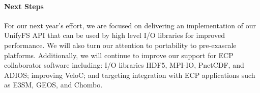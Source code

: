 \paragraph{Next Steps}

For our next year's effort, we are focused on delivering an implementation
of our UnifyFS API that can be used by high level I/O libraries for improved
performance. We will also turn our attention to portability to pre-exascale 
platforms. Additionally, we will continue to improve our support for 
ECP collaborator software including:
I/O libraries HDF5, MPI-IO, PnetCDF, and ADIOS; improving
VeloC; and targeting integration with ECP applications such as
E3SM, GEOS, and Chombo.



